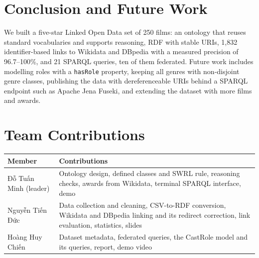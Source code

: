 \documentclass[11pt,a4paper]{article}
\newcommand{\code}[1]{\texttt{#1}}
\begin{document}
\section{Conclusion and Future Work}

We built a five-star Linked Open Data set of 250 films: an ontology that reuses standard vocabularies and supports reasoning, RDF with stable URIs, 1,832 identifier-based links to Wikidata and DBpedia with a measured precision of 96.7--100\%, and 21 SPARQL queries, ten of them federated. Future work includes modelling roles with a \code{hasRole} property, keeping all genres with non-disjoint genre classes, publishing the data with dereferenceable URIs behind a SPARQL endpoint such as Apache Jena Fuseki, and extending the dataset with more films and awards.

\section*{Team Contributions}
\begin{table}[H]
\centering\small
\begin{tabularx}{\textwidth}{@{}l>{\raggedright\arraybackslash}X@{}}
\toprule
Member & Contributions \\
\midrule
Đỗ Tuấn Minh (leader) & Ontology design, defined classes and SWRL rule, reasoning checks, awards from Wikidata, terminal SPARQL interface, demo \\
Nguyễn Tiến Đức & Data collection and cleaning, CSV-to-RDF conversion, Wikidata and DBpedia linking and its redirect correction, link evaluation, statistics, slides \\
Hoàng Huy Chiến & Dataset metadata, federated queries, the CastRole model and its queries, report, demo video \\
\bottomrule
\end{tabularx}
\end{table}
\end{document}
